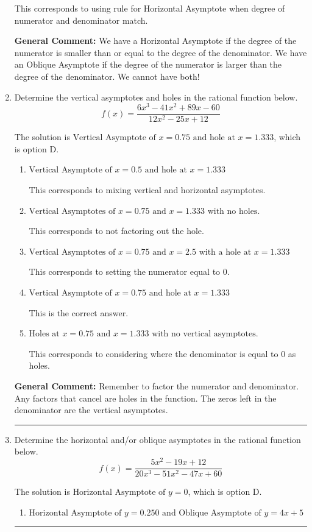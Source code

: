 \documentclass{extbook}[14pt]
\newcommand{\litem}[1]{\item #1

\rule{\textwidth}{0.4pt}}
\begin{document}
\begin{enumerate}
{\begin{enumerate}[label=\Alph*.]
This corresponds to using rule for Horizontal Asymptote when degree of numerator and denominator match.
\end{enumerate}

\textbf{General Comment:} We have a Horizontal Asymptote if the degree of the numerator is smaller than or equal to the degree of the denominator. We have an Oblique Asymptote if the degree of the numerator is larger than the degree of the denominator. We cannot have both!
}
\litem{
Determine the vertical asymptotes and holes in the rational function below.
\[ f(x) = \frac{6x^{3} -41 x^{2} +89 x -60}{12x^{2} -25 x + 12} \]

The solution is \( \text{Vertical Asymptote of } x = 0.75 \text{ and hole at } x = 1.333 \), which is option D.\begin{enumerate}[label=\Alph*.]
\item \( \text{Vertical Asymptote of } x = 0.5 \text{ and hole at } x = 1.333 \)

This corresponds to mixing vertical and horizontal asymptotes.
\item \( \text{Vertical Asymptotes of } x = 0.75 \text{ and } x = 1.333 \text{ with no holes.} \)

This corresponds to not factoring out the hole.
\item \( \text{Vertical Asymptotes of } x = 0.75 \text{ and } x = 2.5 \text{ with a hole at } x = 1.333 \)

This corresponds to setting the numerator equal to 0.
\item \( \text{Vertical Asymptote of } x = 0.75 \text{ and hole at } x = 1.333 \)

This is the correct answer.
\item \( \text{Holes at } x = 0.75 \text{ and } x = 1.333 \text{ with no vertical asymptotes.} \)

This corresponds to considering where the denominator is equal to 0 as holes.
\end{enumerate}

\textbf{General Comment:} Remember to factor the numerator and denominator. Any factors that cancel are holes in the function. The zeros left in the denominator are the vertical asymptotes.
}
\litem{
Determine the horizontal and/or oblique asymptotes in the rational function below.
\[ f(x) = \frac{5x^{2} -19 x + 12}{20x^{3} -51 x^{2} -47 x + 60} \]

The solution is \( \text{Horizontal Asymptote of } y = 0 \), which is option D.\begin{enumerate}[label=\Alph*.]
\item \( \text{Horizontal Asymptote of } y = 0.250 \text{ and Oblique Asymptote of } y = 4x + 5 \)


\end{enumerate}}
\end{enumerate}
\end{document}
